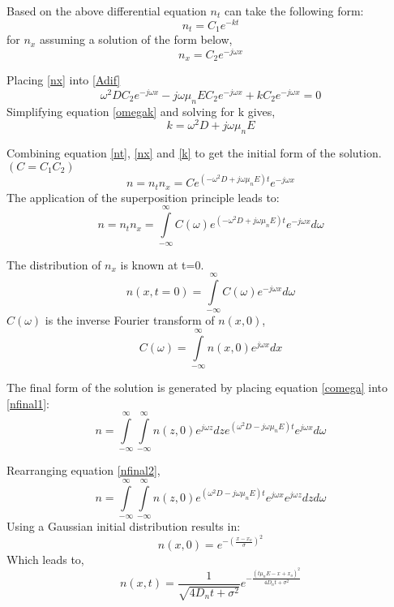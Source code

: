 \begin{doublespace}
Based on the above differential equation $n_t$ can take the following form:
\begin{equation}
n_t=C_1 e^{-kt}
\label{nt}
\end{equation}
 for $n_x$ assuming a solution of the form below,
\begin{equation}
n_x=C_2 e^{-j\omega x}
\label{nx}
\end{equation}

Placing \eqref{nx} into \eqref{Adif} 
\begin{equation}
\omega^2 D C_2 e^{-j\omega x}-j\omega \mu_n E C_2 e^{-j\omega x}+kC_2e^{-j\omega x}=0
\label{omegak}
\end{equation}
Simplifying equation \eqref{omegak} and solving for k gives,
\begin{equation}
k=\omega^2 D+j\omega \mu_n E
\label{k}
\end{equation}

Combining equation \eqref{nt}, \eqref{nx} and \eqref{k} to get the initial form of the solution. $(C=C_1C_2)$
\begin{equation}
n=n_tn_x=Ce^{(-\omega^2 D + j\omega \mu_n E)t} e^{-j\omega x}
\end{equation}
The application of the superposition principle\cite{DifEq} leads to:
\begin{equation}
n=n_tn_x=\int\limits_{-\infty}^{\infty}C(\omega)e^{(-\omega^2 D + j\omega \mu_n E)t} e^{-j\omega x}d\omega
\label{nfinal1}
\end{equation}

The distribution of $n_x$ is known at t=0.
\begin{equation}
n(x,t=0)=\int\limits_{-\infty}^{\infty}C(\omega) e^{-j\omega x}d\omega
\end{equation}
$C(\omega)$ is  the inverse Fourier transform of $n(x,0)$,
\begin{equation}
C(\omega)=\int\limits_{-\infty}^{\infty}n(x,0)e^{j\omega x}dx
\label{comega}
\end{equation}

The final form of the solution is generated by placing equation \eqref{comega} into \eqref{nfinal1}:
\begin{equation}
n=\int\limits_{-\infty}^{\infty}\int\limits_{-\infty}^{\infty}n(z,0)e^{j\omega z}dz e^{(\omega ^2 D-j\omega \mu_n E)t}e^{j\omega x}d\omega
\label{nfinal2}
\end{equation}

Rearranging equation \eqref{nfinal2},
\begin{equation}
n=\int\limits_{-\infty}^{\infty}\int\limits_{-\infty}^{\infty}n(z,0) e^{(\omega ^2 D-j\omega \mu_n E)t}e^{j\omega x} e^{j\omega z}  dz d\omega
\end{equation}
Using a Gaussian initial distribution results in:
\begin{equation}
n(x,0)=e^{- (\frac{x-x_o}{\sigma})^2}
\end{equation}
Which leads to,
\begin{equation}
n(x,t)=\frac{1}{\sqrt{4D_nt+\sigma^{2}}}e^{-\frac{(t\mu_n E-x+x_o)^2}{4D_n t+\sigma^2}}
\end{equation}


\end{doublespace}
